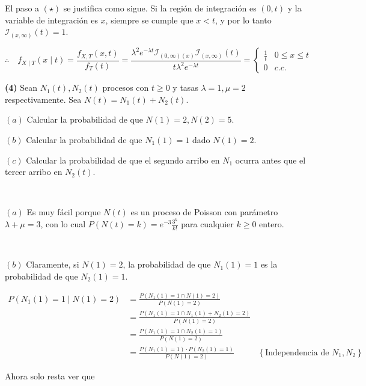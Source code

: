 \documentclass[a4paper, 12pt]{article}
\begin{document}
El paso a $(\star)$ se justifica como sigue. Si la región de integración es $(0, t)$ y la variable de
integración es $x$, siempre se cumple que $x < t$, y por lo tanto
$\mathcal{I}_{(x, \infty)}(t) = 1$.

  \begin{equation*}
    \therefore \quad f_{X \mid T}(x\mid t) = \frac{f_{X, T}(x, t)}{f_T(t)} 
    = \frac{\lambda^2 e^{-\lambda t}\mathcal{I}_{(0, \infty)(x)}\mathcal{I}_{(x,
    \infty)}(t)}{t \lambda^2 e^{-\lambda t}} = \begin{cases}
      \frac{1}{t} & 0 \leq x \leq t  \\ 
      0 & c.c.
    \end{cases}
  \end{equation*}


\pagebreak 

\begin{myframe}
\textbf{(4)} Sean $N_1(t), N_2(t)$ procesos con $t \geq 0$ y tasas $\lambda = 1,
\mu = 2$ respectivamente. Sea $N(t) = N_1(t) + N_2(t)$. 

$(a)$ Calcular la probabilidad de que $N(1) = 2, N(2) = 5$.

$(b)$ Calcular la probabilidad de que $N_1(1) = 1$ dado $N(1) = 2$.

$(c)$ Calcular la probabilidad de que el segundo arribo en $N_1$ ocurra antes
que el tercer arribo en $N_2(t)$.
\end{myframe}

~

$(a)$ Es muy fácil porque $N(t)$ es un proceso de Poisson con parámetro $\lambda
+ \mu = 3$, con lo cual $P(N(t) = k) = e^{-3} \frac{3^k}{k!}$ para cualquier $k
\geq 0$ entero.

~ 

$(b)$ Claramente, si $N(1) = 2$, la probabilidad de que $N_1(1) = 1$ es la
probabilidad de que $N_2(1) = 1$.

\begin{align*}
  P(N_1(1) = 1 \mid N(1) = 2) 
  &= \frac{P(N_1(1) = 1 \cap N(1) = 2)}{P( N(1) = 2 )} \\ 
  &= \frac{ P(N_1(1) = 1 \cap  N_1(1) + N_2(1) = 2) }{P(N(1) = 2)} \\ 
  &= \frac{ P(N_1(1) = 1 \cap N_2(1) = 1) }{P(N(1) = 2)} \\ 
  &=\frac{ P(N_1(1) = 1) \cdot P(N_2(1) = 1) }{P(N(1) = 2)} &\left\{
  \text{Independencia de } N_1, N_2 \right\} 
\end{align*}

Ahora solo resta ver que 
\end{document}
